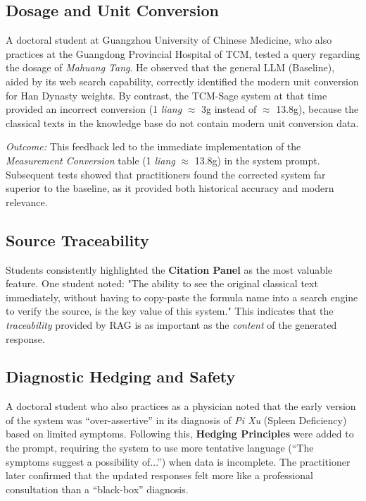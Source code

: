 \subsection{Dosage and Unit Conversion}
A doctoral student at Guangzhou University of Chinese Medicine, who also practices at the Guangdong Provincial Hospital of TCM, tested a query regarding the dosage of \textit{Mahuang Tang}. He observed that the general LLM (Baseline), aided by its web search capability, correctly identified the modern unit conversion for Han Dynasty weights. By contrast, the TCM-Sage system at that time provided an incorrect conversion (1 \textit{liang} $\approx$ 3g instead of $\approx$ 13.8g), because the classical texts in the knowledge base do not contain modern unit conversion data.

\textit{Outcome:} This feedback led to the immediate implementation of the \textit{Measurement Conversion} table (1 \textit{liang} $\approx$ 13.8g) in the system prompt. Subsequent tests showed that practitioners found the corrected system far superior to the baseline, as it provided both historical accuracy and modern relevance.

\subsection{Source Traceability}
Students consistently highlighted the \textbf{Citation Panel} as the most valuable feature. One student noted: "The ability to see the original classical text immediately, without having to copy-paste the formula name into a search engine to verify the source, is the key value of this system." This indicates that the \textit{traceability} provided by RAG is as important as the \textit{content} of the generated response.

\subsection{Diagnostic Hedging and Safety}
A doctoral student who also practices as a physician noted that the early version of the system was ``over-assertive'' in its diagnosis of \textit{Pi Xu} (Spleen Deficiency) based on limited symptoms. Following this, \textbf{Hedging Principles} were added to the prompt, requiring the system to use more tentative language (``The symptoms suggest a possibility of...'') when data is incomplete. The practitioner later confirmed that the updated responses felt more like a professional consultation than a ``black-box'' diagnosis.

